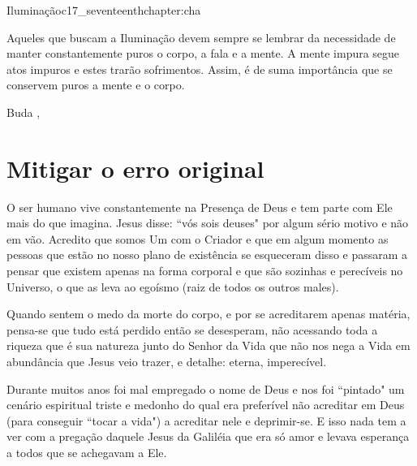 \begin{chapterpage}{Iluminação}{c17_seventeenthchapter:cha}

\begin{myquotation}Aqueles que buscam a Iluminação devem sempre se lembrar da necessidade de manter constantemente puros o corpo, a fala e a mente. A mente impura segue atos impuros e estes trarão sofrimentos. Assim, é de suma importância que se conservem puros a mente e o corpo.
 
\par\vspace*{15mm}
\mbox{}\hfill \emdash{}Buda 
, %
\par\end{myquotation}

\end{chapterpage}



\section{Mitigar o erro original}\label{c1_basicformatting:sec}

\emdash{}O ser humano vive constantemente na Presença de Deus e tem parte com Ele mais do que imagina. Jesus disse: ``vós sois deuses" por algum sério motivo e não em vão. Acredito que somos Um com o Criador e que em algum momento as pessoas que estão no nosso plano de existência se esqueceram disso e passaram a pensar que existem apenas na forma corporal e que são sozinhas e perecíveis no Universo, o que as leva ao egoísmo (raiz de todos os outros males).

\emdash{}Quando sentem o medo da morte do corpo, e por se acreditarem apenas matéria, pensa-se que tudo está perdido então se desesperam, não acessando toda a riqueza que é sua natureza junto do Senhor da Vida que não nos nega a Vida em abundância que Jesus veio trazer, e detalhe: eterna, imperecível.

\emdash{}Durante muitos anos foi mal empregado o nome de Deus e nos foi ``pintado" um cenário espiritual triste e medonho do qual era preferível não acreditar em Deus (para conseguir ``tocar a vida") a acreditar nele e deprimir-se. E isso nada tem a ver com a pregação daquele Jesus da Galiléia que era só amor e levava esperança a todos que se achegavam a Ele.

